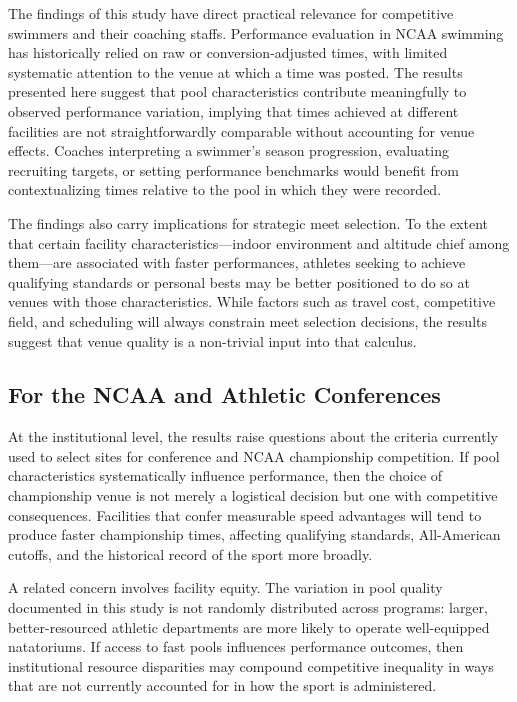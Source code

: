 \documentclass[12pt]{article}
\begin{document}
The findings of this study have direct practical relevance for competitive
swimmers and their coaching staffs. Performance evaluation in NCAA swimming has
historically relied on raw or conversion-adjusted times, with limited systematic
attention to the venue at which a time was posted. The results presented here
suggest that pool characteristics contribute meaningfully to observed performance
variation, implying that times achieved at different facilities are not
straightforwardly comparable without accounting for venue effects. Coaches
interpreting a swimmer's season progression, evaluating recruiting targets, or
setting performance benchmarks would benefit from contextualizing times relative
to the pool in which they were recorded.

The findings also carry implications for strategic meet selection. To the extent
that certain facility characteristics---indoor environment and altitude chief
among them---are associated with faster performances, athletes seeking to
achieve qualifying standards or personal bests may be better positioned to do
so at venues with those characteristics. While factors such as travel cost,
competitive field, and scheduling will always constrain meet selection decisions,
the results suggest that venue quality is a non-trivial input into that calculus.

\subsection{For the NCAA and Athletic Conferences}

At the institutional level, the results raise questions about the criteria
currently used to select sites for conference and NCAA championship competition.
If pool characteristics systematically influence performance, then the choice of
championship venue is not merely a logistical decision but one with competitive
consequences. Facilities that confer measurable speed advantages will tend to
produce faster championship times, affecting qualifying standards, All-American
cutoffs, and the historical record of the sport more broadly.

A related concern involves facility equity. The variation in pool quality
documented in this study is not randomly distributed across programs: larger,
better-resourced athletic departments are more likely to operate well-equipped
natatoriums. If access to fast pools influences performance outcomes, then
institutional resource disparities may compound competitive inequality in ways
that are not currently accounted for in how the sport is administered.
\end{document}
